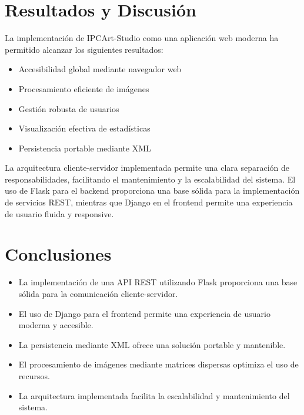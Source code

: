 \documentclass[letterpaper,12pt]{article}
\begin{document}
\begin{multicols}{2}


    \section*{Resultados y Discusión}
    La implementación de IPCArt-Studio como una aplicación web moderna ha permitido alcanzar los siguientes resultados:

    \begin{itemize}
        \item Accesibilidad global mediante navegador web
        \item Procesamiento eficiente de imágenes
        \item Gestión robusta de usuarios
        \item Visualización efectiva de estadísticas
        \item Persistencia portable mediante XML
    \end{itemize}

    La arquitectura cliente-servidor implementada permite una clara separación de responsabilidades, facilitando el mantenimiento y la escalabilidad del sistema. El uso de Flask para el backend proporciona una base sólida para la implementación de servicios REST, mientras que Django en el frontend permite una experiencia de usuario fluida y responsive.

    \section*{Conclusiones}
    \begin{itemize}
        \item La implementación de una API REST utilizando Flask proporciona una base sólida para la comunicación cliente-servidor.
        \item El uso de Django para el frontend permite una experiencia de usuario moderna y accesible.
        \item La persistencia mediante XML ofrece una solución portable y mantenible.
        \item El procesamiento de imágenes mediante matrices dispersas optimiza el uso de recursos.
        \item La arquitectura implementada facilita la escalabilidad y mantenimiento del sistema.
    \end{itemize}


\end{multicols}
\end{document}
